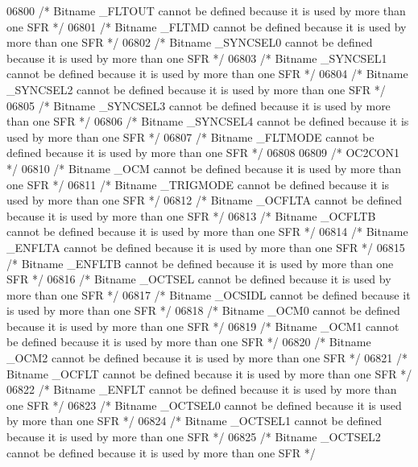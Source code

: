\begin{DoxyCode}
06800 \textcolor{comment}{/* Bitname \_FLTOUT cannot be defined because it is used by more than one SFR */}
06801 \textcolor{comment}{/* Bitname \_FLTMD cannot be defined because it is used by more than one SFR */}
06802 \textcolor{comment}{/* Bitname \_SYNCSEL0 cannot be defined because it is used by more than one SFR */}
06803 \textcolor{comment}{/* Bitname \_SYNCSEL1 cannot be defined because it is used by more than one SFR */}
06804 \textcolor{comment}{/* Bitname \_SYNCSEL2 cannot be defined because it is used by more than one SFR */}
06805 \textcolor{comment}{/* Bitname \_SYNCSEL3 cannot be defined because it is used by more than one SFR */}
06806 \textcolor{comment}{/* Bitname \_SYNCSEL4 cannot be defined because it is used by more than one SFR */}
06807 \textcolor{comment}{/* Bitname \_FLTMODE cannot be defined because it is used by more than one SFR */}
06808 
06809 \textcolor{comment}{/* OC2CON1 */}
06810 \textcolor{comment}{/* Bitname \_OCM cannot be defined because it is used by more than one SFR */}
06811 \textcolor{comment}{/* Bitname \_TRIGMODE cannot be defined because it is used by more than one SFR */}
06812 \textcolor{comment}{/* Bitname \_OCFLTA cannot be defined because it is used by more than one SFR */}
06813 \textcolor{comment}{/* Bitname \_OCFLTB cannot be defined because it is used by more than one SFR */}
06814 \textcolor{comment}{/* Bitname \_ENFLTA cannot be defined because it is used by more than one SFR */}
06815 \textcolor{comment}{/* Bitname \_ENFLTB cannot be defined because it is used by more than one SFR */}
06816 \textcolor{comment}{/* Bitname \_OCTSEL cannot be defined because it is used by more than one SFR */}
06817 \textcolor{comment}{/* Bitname \_OCSIDL cannot be defined because it is used by more than one SFR */}
06818 \textcolor{comment}{/* Bitname \_OCM0 cannot be defined because it is used by more than one SFR */}
06819 \textcolor{comment}{/* Bitname \_OCM1 cannot be defined because it is used by more than one SFR */}
06820 \textcolor{comment}{/* Bitname \_OCM2 cannot be defined because it is used by more than one SFR */}
06821 \textcolor{comment}{/* Bitname \_OCFLT cannot be defined because it is used by more than one SFR */}
06822 \textcolor{comment}{/* Bitname \_ENFLT cannot be defined because it is used by more than one SFR */}
06823 \textcolor{comment}{/* Bitname \_OCTSEL0 cannot be defined because it is used by more than one SFR */}
06824 \textcolor{comment}{/* Bitname \_OCTSEL1 cannot be defined because it is used by more than one SFR */}
06825 \textcolor{comment}{/* Bitname \_OCTSEL2 cannot be defined because it is used by more than one SFR */}

\end{DoxyCode}
